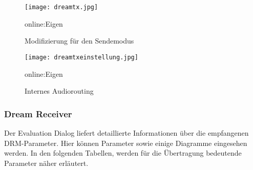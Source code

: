 \begin{figure}[H]
	\centering
	\texttt{[image: dreamtx.jpg]}
	\caption[Modifizierung für den Sendemodus]{Modifizierung für den Sendemodus} \gls{online:Eigen}
	\label{fig:dreamtx}
\end{figure}

\begin{figure}[H]
	\centering
	\texttt{[image: dreamtxeinstellung.jpg]}
	\caption[Internes Audiorouting]{Internes Audiorouting} \gls{online:Eigen}
	\label{fig:dreamtxeinstellung}
\end{figure}

\subsubsection{Dream Receiver}
\label{subsec:Unterabschnitt12}

Der Evaluation Dialog liefert detaillierte Informationen über die empfangenen DRM-Parameter. Hier können Parameter sowie einige Diagramme eingesehen werden. In den folgenden Tabellen, werden für die Übertragung bedeutende Parameter näher erläutert.

